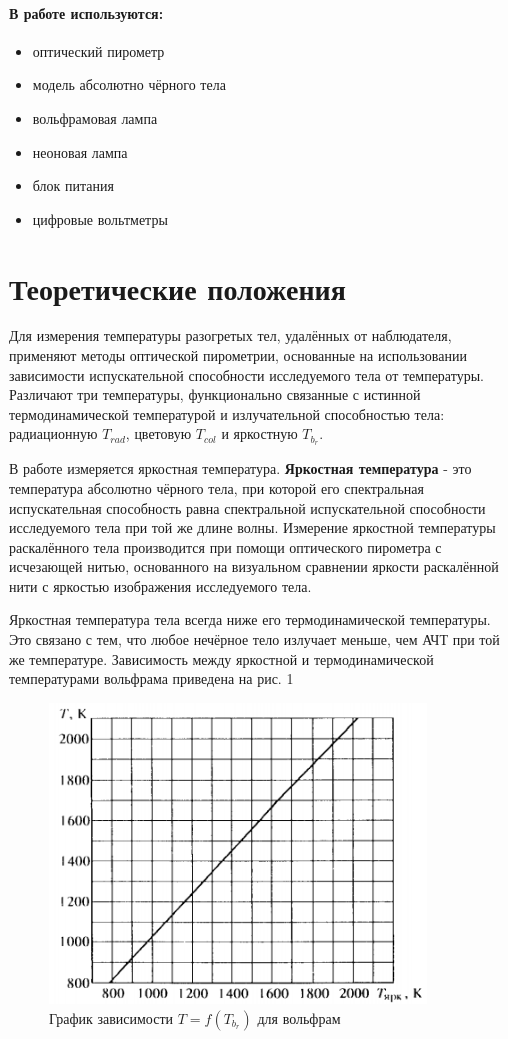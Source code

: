\documentclass[a4paper,12pt]{article} %
\begin{document}
\paragraph*{В работе используются:}
\begin{itemize}
    \item оптический пирометр
    \item модель абсолютно чёрного тела
    \item вольфрамовая лампа
    \item неоновая лампа
    \item блок питания
    \item цифровые вольтметры
\end{itemize}

\section*{Теоретические положения}
Для измерения температуры разогретых тел, удалённых от наблюдателя, применяют методы оптической пирометрии, основанные на использовании зависимости испускательной способности исследуемого тела от температуры. Различают три температуры, функционально связанные с истинной термодинамической температурой и излучательной способностью тела: радиационную $T_{rad}$, цветовую $T_{col}$ и яркостную $T_b_r$. \par
В работе измеряется яркостная температура. \textbf{Яркостная температура} - это температура абсолютно чёрного тела, при которой его спектральная испускательная способность равна спектральной испускательной способности исследуемого тела при той же длине волны.
 Измерение яркостной температуры раскалённого тела производится при помощи оптического пирометра с исчезающей нитью, основанного на визуальном сравнении яркости раскалённой нити с яркостью изображения исследуемого тела. \par
Яркостная температура тела всегда ниже его термодинамической температуры. Это связано с тем, что любое нечёрное тело излучает меньше, чем АЧТ при той же температуре. Зависимость между яркостной и термодинамической температурами вольфрама приведена на рис. 1

\begin{figure}[h]
    \centering
    \includegraphics[width=10cm]{fig2.PNG}
    \caption{График зависимости $T = f(T_b_r)$ для вольфрам}
    \label{fig:vac}
\end{figure}
\end{document}
